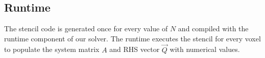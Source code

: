 \documentclass{egpubl}
\newcommand{\nocontentsline}[3]{}
\newcommand{\tocless}[2]{\bgroup\let\addcontentsline=\nocontentsline#1{#2}\egroup}
\begin{document}





\tocless\subsection{Runtime}
\label{sec:solver_runtime}

The stencil code is generated once for every value of $N$ and compiled with the runtime component of our solver. The runtime executes the stencil for every voxel to populate the system matrix $A$ and RHS vector $\vec{Q}$ with numerical values.
\end{document}
